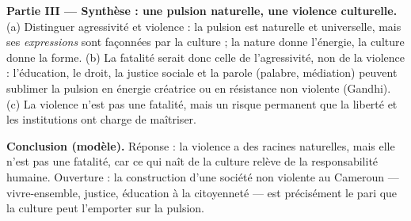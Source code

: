 \documentclass[11pt]{article}
\newcommand{\cle}[1]{{\popxbold\color{popdark}#1}}
\begin{document}
\begin{corrige}
\textbf{Partie III — Synthèse : une pulsion naturelle, une violence culturelle.} (a) Distinguer \cle{agressivité} et \cle{violence} : la pulsion est naturelle et universelle, mais ses \emph{expressions} sont façonnées par la culture ; la nature donne l'énergie, la culture donne la forme. (b) La fatalité serait donc celle de l'agressivité, non de la violence : l'éducation, le droit, la justice sociale et la parole (palabre, médiation) peuvent sublimer la pulsion en énergie créatrice ou en résistance non violente (Gandhi). (c) La violence n'est pas une fatalité, mais un risque permanent que la liberté et les institutions ont charge de maîtriser.

\textbf{Conclusion (modèle).} Réponse : la violence a des racines naturelles, mais elle n'est pas une fatalité, car ce qui naît de la culture relève de la responsabilité humaine. Ouverture : la construction d'une société non violente au Cameroun — vivre-ensemble, justice, éducation à la citoyenneté — est précisément le pari que la culture peut l'emporter sur la pulsion.

\end{corrige}
\end{document}

